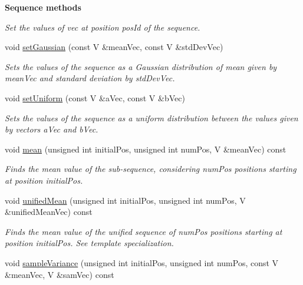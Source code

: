 \begin{Indent}{\bf Sequence methods}
\begin{DoxyCompactItemize}
\begin{DoxyCompactList}\small\item\em Set the values of {\ttfamily vec} at position {\ttfamily pos\-Id} of the sequence. \end{DoxyCompactList}\item 
void \hyperlink{class_q_u_e_s_o_1_1_array_of_sequences_a9168423928360ee9dd3d3521f5539892}{set\-Gaussian} (const V \&mean\-Vec, const V \&std\-Dev\-Vec)
\begin{DoxyCompactList}\small\item\em Sets the values of the sequence as a Gaussian distribution of mean given by {\ttfamily mean\-Vec} and standard deviation by {\ttfamily std\-Dev\-Vec}. \end{DoxyCompactList}\item 
void \hyperlink{class_q_u_e_s_o_1_1_array_of_sequences_a478f81e5a47e06074577b46b2f8fdfd1}{set\-Uniform} (const V \&a\-Vec, const V \&b\-Vec)
\begin{DoxyCompactList}\small\item\em Sets the values of the sequence as a uniform distribution between the values given by vectors {\ttfamily a\-Vec} and {\ttfamily b\-Vec}. \end{DoxyCompactList}\item 
void \hyperlink{class_q_u_e_s_o_1_1_array_of_sequences_ae9d785ccc1cbf94447efd2dae6467c3d}{mean} (unsigned int initial\-Pos, unsigned int num\-Pos, V \&mean\-Vec) const 
\begin{DoxyCompactList}\small\item\em Finds the mean value of the sub-\/sequence, considering {\ttfamily num\-Pos} positions starting at position {\ttfamily initial\-Pos}. \end{DoxyCompactList}\item 
void \hyperlink{class_q_u_e_s_o_1_1_array_of_sequences_aff464566fefc76edb13ac6f6f8f2bd31}{unified\-Mean} (unsigned int initial\-Pos, unsigned int num\-Pos, V \&unified\-Mean\-Vec) const 
\begin{DoxyCompactList}\small\item\em Finds the mean value of the unified sequence of {\ttfamily num\-Pos} positions starting at position {\ttfamily initial\-Pos}. See template specialization. \end{DoxyCompactList}\item 
void \hyperlink{class_q_u_e_s_o_1_1_array_of_sequences_a7bce5c84299185882c0bb7c6d61bce6d}{sample\-Variance} (unsigned int initial\-Pos, unsigned int num\-Pos, const V \&mean\-Vec, V \&sam\-Vec) const 

\end{DoxyCompactItemize}
\end{Indent}
